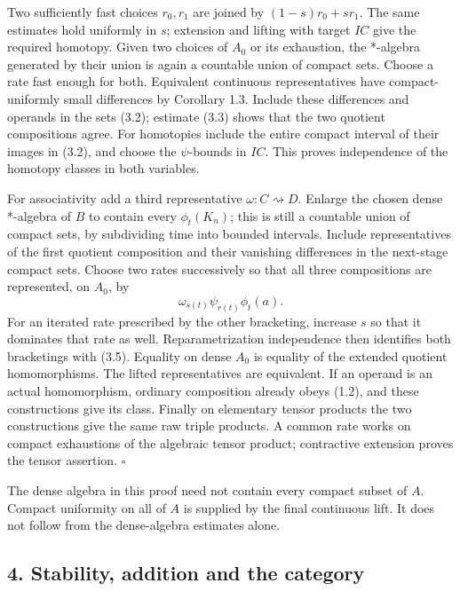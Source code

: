 \documentclass[
  11pt,
]{article}
\begin{document}
Two sufficiently fast choices \(r_0,r_1\) are joined by
\((1-s)r_0+sr_1\). The same estimates hold uniformly in \(s\); extension
and lifting with target \(IC\) give the required homotopy. Given two
choices of \(A_0\) or its exhaustion, the *-algebra generated by their
union is again a countable union of compact sets. Choose a rate fast
enough for both. Equivalent continuous representatives have
compact-uniformly small differences by Corollary 1.3. Include these
differences and operands in the sets (3.2); estimate (3.3) shows that
the two quotient compositions agree. For homotopies include the entire
compact interval of their images in (3.2), and choose the
\(\psi\)-bounds in \(IC\). This proves independence of the homotopy
classes in both variables.

For associativity add a third representative
\(\omega:C \rightsquigarrow D\). Enlarge the chosen dense *-algebra of
\(B\) to contain every \(\phi_t(K_n)\); this is still a countable union
of compact sets, by subdividing time into bounded intervals. Include
representatives of the first quotient composition and their vanishing
differences in the next-stage compact sets. Choose two rates
successively so that all three compositions are represented, on \(A_0\),
by \[
\omega_{s(t)}\psi_{r(t)}\phi_t(a).
\tag{3.5}
\] For an iterated rate prescribed by the other bracketing, increase
\(s\) so that it dominates that rate as well. Reparametrization
independence then identifies both bracketings with (3.5). Equality on
dense \(A_0\) is equality of the extended quotient homomorphisms. The
lifted representatives are equivalent. If an operand is an actual
homomorphism, ordinary composition already obeys (1.2), and these
constructions give its class. Finally on elementary tensor products the
two constructions give the same raw triple products. A common rate works
on compact exhaustions of the algebraic tensor product; contractive
extension proves the tensor assertion. \(\square\)

The dense algebra in this proof need not contain every compact subset of
\(A\). Compact uniformity on all of \(A\) is supplied by the final
continuous lift. It does not follow from the dense-algebra estimates
alone.

\subsection{4. Stability, addition and the
category}\label{stability-addition-and-the-category}
\end{document}
